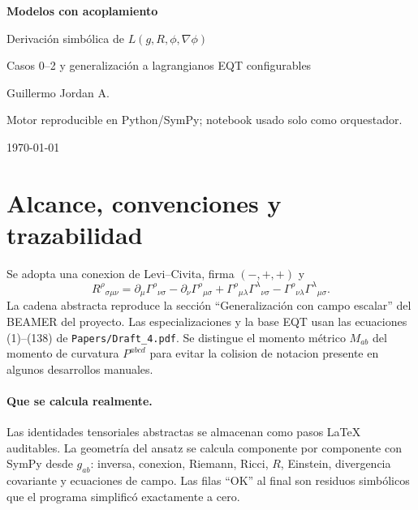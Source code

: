 \documentclass[11pt,a4paper]{article}
\begin{document}
\hypersetup{pageanchor=false}
\begin{titlepage}
\centering
\vspace*{2.4cm}
{\Huge\bfseries Modelos con acoplamiento\par}
\vspace{0.7cm}
{\Large Derivación simbólica de $L(g,R,\phi,\nabla\phi)$\par}
\vspace{0.35cm}
{\large Casos 0--2 y generalización a lagrangianos EQT configurables\par}
\vfill
{\large Guillermo Jordan A.\par}
\vspace{0.4cm}
{\small Motor reproducible en Python/SymPy; notebook usado solo como orquestador.\par}
\vfill
{\today\par}
\end{titlepage}
\hypersetup{pageanchor=true}

\tableofcontents
\clearpage
{}

\section{Alcance, convenciones y trazabilidad}
Se adopta una conexion de Levi--Civita, firma $(-,+,+)$ y
\[
R^\rho{}_{\sigma\mu\nu}=\partial_\mu\Gamma^\rho{}_{\nu\sigma}
-\partial_\nu\Gamma^\rho{}_{\mu\sigma}
+\Gamma^\rho{}_{\mu\lambda}\Gamma^\lambda{}_{\nu\sigma}
-\Gamma^\rho{}_{\nu\lambda}\Gamma^\lambda{}_{\mu\sigma}.
\]
La cadena abstracta reproduce la sección ``Generalización con campo escalar'' del
BEAMER del proyecto. Las especializaciones y la base EQT usan las ecuaciones
(1)--(138) de \texttt{Papers/Draft\_4.pdf}. Se distingue el momento métrico $M_{ab}$ del momento
de curvatura $P^{abcd}$ para evitar la colision de notacion presente en algunos
desarrollos manuales.

\paragraph{Que se calcula realmente.}
Las identidades tensoriales abstractas se almacenan como pasos LaTeX auditables.
La geometría del ansatz se calcula componente por componente con SymPy desde
$g_{ab}$: inversa, conexion, Riemann, Ricci, $R$, Einstein, divergencia covariante
y ecuaciones de campo. Las filas ``OK'' al final son residuos simbólicos que el
programa simplificó exactamente a cero.
\end{document}
